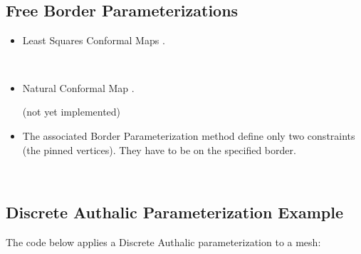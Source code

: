   \\
  \\
  \\
  \\


\subsection{Free Border Parameterizations}

\begin{itemize}

\item Least Squares Conformal Maps \cite{cgal:lprm-lscm-02}.

  \\

\item Natural Conformal Map \cite{cgal:dma-ipsm-02}.

(not yet implemented)

\end{itemize}

\begin{itemize}

\item The associated Border Parameterization method define only two constraints (the pinned
vertices). They have to be on the specified border.

  \\

\end{itemize}


\subsection{Discrete Authalic Parameterization Example}

The code below applies a Discrete Authalic parameterization to a  mesh:

